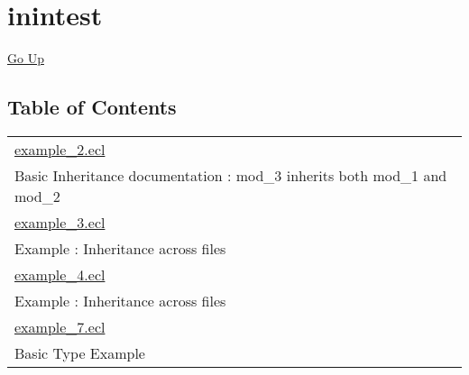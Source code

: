 \chapter*{\color{headtoc} inintest}
\hypertarget{ecldoc:toc:root/intest/inintest}{}
\hyperlink{ecldoc:toc:root/intest}{Go Up}


\section*{Table of Contents}
{\renewcommand{\arraystretch}{1.5}
\begin{longtable}{|p{\textwidth}|}
\hline
\hyperlink{ecldoc:toc:intest.inintest.example_2}{example\_2.ecl} \\
Basic Inheritance documentation : mod\_3 inherits both mod\_1 and mod\_2 \\
\hline
\hyperlink{ecldoc:toc:intest.inintest.example_3}{example\_3.ecl} \\
Example : Inheritance across files \\
\hline
\hyperlink{ecldoc:toc:intest.inintest.example_4}{example\_4.ecl} \\
Example : Inheritance across files \\
\hline
\hyperlink{ecldoc:toc:intest.inintest.example_7}{example\_7.ecl} \\
Basic Type Example \\
\hline
\end{longtable}
}





